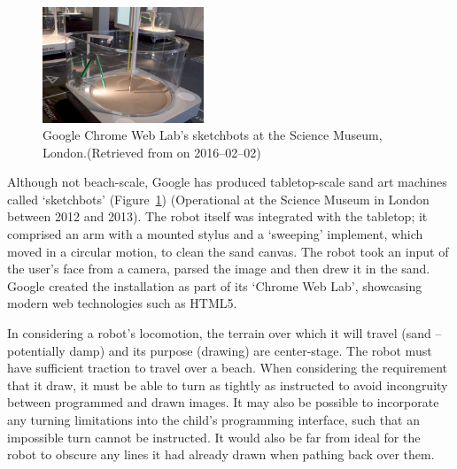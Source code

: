     \begin{figure}
      \begin{center}
        \includegraphics[width=0.43\textwidth]{Files/sketchbots}
      \end{center}
      \caption{Google Chrome Web Lab's sketchbots at the Science Museum, London.{\small (Retrieved from  on 2016--02--02)}}
      \label{fig: sketchbots}
    \end{figure}
    Although not beach-scale, Google has produced tabletop-scale sand art machines called `sketchbots' (Figure~\ref{fig: sketchbots}) (Operational at the Science Museum in London between 2012 and 2013).\cite{Warman2012} The robot itself was integrated with the tabletop; it comprised an arm with a mounted stylus and a `sweeping' implement, which moved in a circular motion, to clean the sand canvas. The robot took an input of the user's face from a camera, parsed the image and then drew it in the sand. Google  created the installation as part of its `Chrome Web Lab', showcasing modern web technologies such as HTML5.

    In considering a robot's locomotion, the terrain over which it will travel (sand -- potentially damp) and its purpose (drawing) are center-stage. The robot must have sufficient traction to travel over a beach. When considering the requirement that it draw, it must be able to turn as tightly as instructed to avoid incongruity between programmed and drawn images. It may also be possible to incorporate any turning limitations into the child's programming interface, such that an impossible turn cannot be instructed. It would also be far from ideal for the robot to obscure any lines it had already drawn when pathing back over them.

